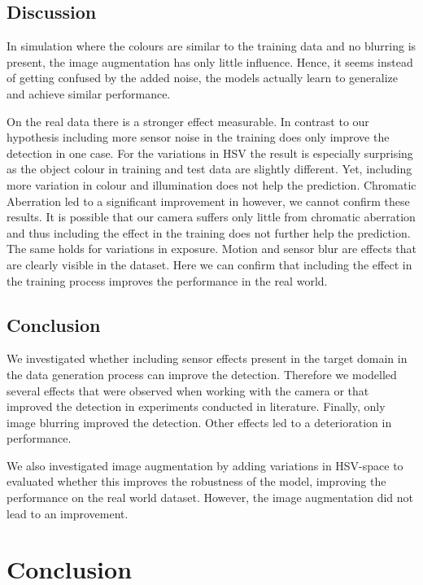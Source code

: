 \subsection{Discussion}

In simulation where the colours are similar to the training data and no blurring is present, the image augmentation has only little influence. Hence, it seems instead of getting confused by the added noise, the models actually learn to generalize and achieve similar performance.

On the real data there is a stronger effect measurable. In contrast to our hypothesis including more sensor noise in the training does only improve the detection in one case. For the variations in HSV the result is especially surprising as the object colour in training and test data are slightly different. Yet, including more variation in colour and illumination does not help the prediction. Chromatic Aberration led to a significant improvement in \cite{Carlson2018} however, we cannot confirm these results. It is possible that our camera suffers only little from  chromatic aberration and thus including the effect in the training does not further help the prediction. The same holds for variations in exposure. Motion and sensor blur are effects that are clearly visible in the dataset. Here we can confirm that including the effect in the training process improves the performance in the real world.

\subsection{Conclusion}

We investigated whether including sensor effects present in the target domain in the data generation process can improve the detection. Therefore we modelled several effects that were observed when working with the camera or that improved the detection in experiments conducted in literature. Finally, only image blurring improved the detection. Other effects led to a deterioration in performance.

We also investigated image augmentation by adding variations in HSV-space to evaluated whether this improves the robustness of the model, improving the performance on the real world dataset. However, the image augmentation did not lead to an improvement.


\section{Conclusion}
\label{sec:training:conclusion}

